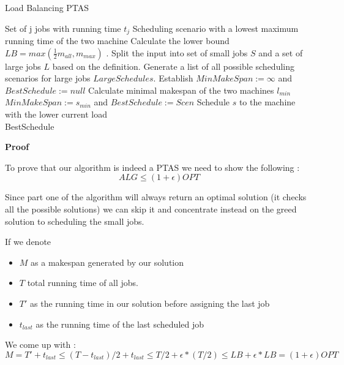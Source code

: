 \begin{algorithm}[H]
  \caption{Load Balancing PTAS}
  \label{alg:load_balancing_ptas}
  \begin{algorithmic}
    \Require Set of j jobs with running time $t_j$
    \Ensure Scheduling scenario with a lowest maximum running time of the two machine 
    \renewcommand{\algorithmicrequire}{\textbf{Input:}}
    \renewcommand{\algorithmicensure}{\textbf{Output:}}
    \algnewcommand{}
    \algnewcommand\Operation{\item[\algorithmicoperation]}
    \Operation
    \State Calculate the lower bound $ LB = max(\frac{1}{2}m_{all}, m_{max}) $ .
    \State Split the input into set of small jobs $ S $ and a set of large jobs $ L $  based on the definition.
    \State Generate a list of all possible scheduling scenarios for large jobs $ LargeSchedules $.
    \State Establish $ MinMakeSpan := \infty $ and $ BestSchedule:= null $
    \State Calculate minimal makespan of the two machines $ l_{min} $
    \State $ MinMakeSpan := s_{min} $ and $ BestSchedule := Scen $
    \EndIf
    \EndFor
    \State Schedule $ s $ to the machine with the lower current load
    \EndFor\\
    \Return BestSchedule
  \end{algorithmic}
\end{algorithm}

\textbf{Proof}

To prove that our algorithm is indeed a PTAS we need to show the following :
$$ ALG \le (1 + \epsilon ) OPT $$ 

Since part one of the algorithm will always return an optimal solution (it checks all 
the possible solutions) we can skip it and concentrate instead on the greed solution
to scheduling the small jobs.

If we denote 
\begin{itemize}
	\item $ M $ as a makespan generated by our solution
	\item $ T $ total running time of all jobs.
	\item $ T' $ as the running time in our solution before assigning the last job
	\item $ t_{last} $ as the running time of the last scheduled job
\end{itemize}
We come up with :
$$ M = T' + t_{last} \le ( T - t_{last} )/2 + t_{last} \le T/2 + \epsilon * (T/2) \le LB + \epsilon * LB = (1 + \epsilon ) OPT $$

